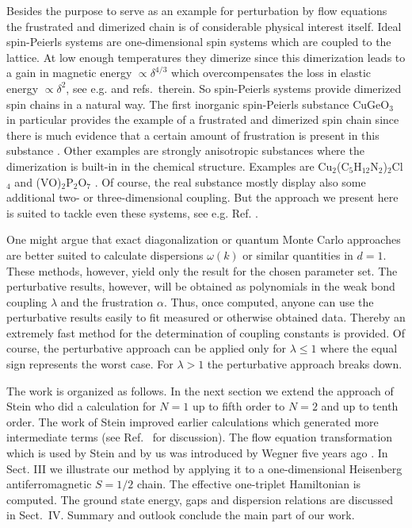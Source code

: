Besides the purpose to serve as an example for perturbation
by flow equations the frustrated and dimerized chain is 
of considerable physical interest itself. 
Ideal spin-Peierls systems are one-dimensional spin systems
which are coupled to the lattice. At low enough temperatures
they dimerize since this dimerization leads to a gain in magnetic
energy $\propto \delta^{4/3}$ which overcompensates the loss in
elastic energy $\propto \delta^{2}$, see e.g. \cite{bray83} and refs.~therein.
So spin-Peierls systems provide dimerized spin chains in a natural way. 
The first inorganic spin-Peierls substance CuGeO$_3$
 in particular provides the example of a frustrated and dimerized
spin chain since there is much evidence that a certain amount of
frustration is present in this substance \cite{riera95,casti95,fabri98a}.
Other examples are strongly anisotropic substances where the
dimerization is built-in in the chemical structure. Examples
are Cu$_2$(C$_5$H$_{12}$N$_2$)$_2$Cl$_4$ \cite{chabo97}
and (VO)$_2$P$_2$O$_7$ \cite{garre97a}.
Of course,  the real substance mostly display also some
additional two- or three-dimensional coupling. But the approach
we present here is suited to tackle even these systems, see e.g.
Ref. \cite{uhrig98c}.

One might argue that exact diagonalization or quantum Monte Carlo
approaches are better suited to calculate  dispersions $\omega(k)$
or similar quantities in $d=1$. These methods, however, yield
only the result for the chosen parameter set. The perturbative results,
however, will be obtained as polynomials in the weak bond coupling
$\lambda$ and the frustration $\alpha$. Thus, once computed, anyone
can use the perturbative results easily to 
fit measured or otherwise obtained data.
Thereby an extremely fast method for the determination of
coupling constants is provided. Of course, the perturbative approach
can be applied only for $\lambda\le1$ where the equal sign represents
the worst case. For $\lambda > 1$ the perturbative approach
breaks down.

The work is organized as follows. In the next section
we extend the approach of Stein \cite{stein97} who did 
a calculation for $N=1$ up to fifth order 
to $N=2$ and up to tenth order. 
The work of Stein improved earlier calculations \cite{macdo88}
which generated more intermediate terms (see Ref.~\cite{stein97}
for discussion).
The flow equation transformation
which is used by Stein and by us was introduced by
Wegner five years ago \cite{wegne94}.
In Sect. III we illustrate our method by applying
it to a one-dimensional Heisenberg antiferromagnetic
$S=1/2$ chain. The effective one-triplet Hamiltonian
is computed. The ground state energy, gaps and dispersion
relations are discussed in Sect.~IV. Summary and outlook
conclude the main part of our work.


